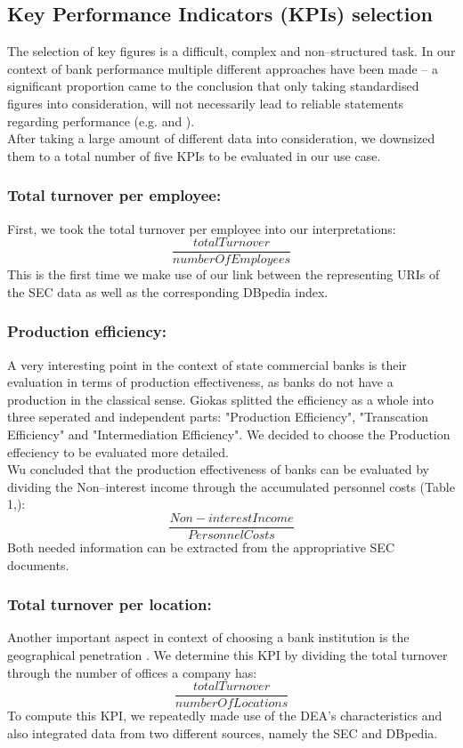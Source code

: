 \documentclass[runningheads]{llncs}
\begin{document}
\subsection{Key Performance Indicators (KPIs) selection}
\label{3.2}
The selection of key figures is a difficult, complex and non--structured task. In our context of bank performance multiple different approaches have been made \cite{KPDZ06} -- a significant proportion came to the conclusion that only taking standardised figures into consideration, will not necessarily lead to reliable statements regarding performance (e.g. \cite{HaSC97} and \cite{BhSh07}). \\
After taking a large amount of different data into consideration, we downsized them to a total number of five KPIs to be evaluated in our use case.
\subsubsection{Total turnover per employee:}
First, we took the total turnover per employee \cite{SeZh99} into our interpretations:
\begin{equation}
\frac{totalTurnover}{numberOfEmployees}
\end{equation}
This is the first time we make use of our link between the representing URIs of the SEC data as well as the corresponding DBpedia index.
\subsubsection{Production efficiency:}
A very interesting point in the context of state commercial banks is their evaluation in terms of production effectiveness, as banks do not have a production in the classical sense. Giokas \cite{Gio08} splitted the efficiency as a whole into three seperated and independent parts: "Production Efficiency", "Transcation Efficiency" and "Intermediation Efficiency". We decided to choose the Production effeciency to be evaluated more detailed.\\
Wu concluded that the production effectiveness of banks can be evaluated by dividing the Non--interest income through the accumulated personnel costs (Table 1,\cite{Wu12}):
\begin{equation}
\frac{Non-interestIncome}{PersonnelCosts}
\end{equation}
Both needed information can be extracted from the appropriative SEC documents.
\subsubsection{Total turnover per location:}
Another important aspect in context of choosing a bank institution is the geographical penetration \cite{DeGe05}. We determine this KPI by dividing the total turnover through the number of offices a company has:
\begin{equation}
\frac{totalTurnover}{numberOfLocations}
\end{equation}
To compute this KPI, we repeatedly made use of the DEA's characteristics and also integrated data from two different sources, namely the SEC and DBpedia.
\end{document}
